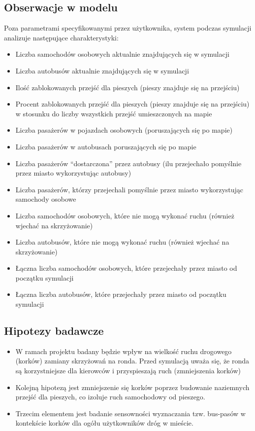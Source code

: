 \documentclass{article}
\begin{document}
\subsection{Obserwacje w modelu}
\label{subsection:obserwacje}
Poza parametrami specyfikowanymi przez użytkownika, system podczas symulacji analizuje następujące charakterystyki:
\begin{itemize}
    \item Liczba samochodów osobowych aktualnie znajdujących się w symulacji
    \item Liczba autobusów aktualnie znajdujących się w symulacji
    \item Ilość zablokowanych przejść dla pieszych (pieszy znajduje się na przejściu)
    \item Procent zablokowanych przejść dla pieszych (pieszy znajduje się na przejściu) w stosunku do liczby wszystkich przejść umieszczonych na mapie
    \item Liczba pasażerów w pojazdach osobowych (poruszających się po mapie)
    \item Liczba pasażerów w autobusach poruszających się po mapie
    \item Liczba pasażerów ``dostarczona'' przez autobusy (ilu przejechało pomyślnie przez miasto wykorzystując autobusy)
    \item Liczba pasażerów, którzy przejechali pomyślnie przez miasto wykorzystując samochody osobowe
    \item Liczba samochodów osobowych, które nie mogą wykonać ruchu (również wjechać na skrzyżowanie)
    \item Liczba autobusów, które nie mogą wykonać ruchu (również wjechać na skrzyżowanie)
    \item Łączna liczba samochodów osobowych, które przejechały przez miasto od początku symulacji
    \item Łączna liczba autobusów, które przejechały przez miasto od początku symulacji
\end{itemize}

\subsection{Hipotezy badawcze}
\label{subsection:hipotezy}
\begin{itemize}
    \item W ramach projektu badany będzie wpływ na wielkość ruchu drogowego (korków) zamiany skrzyżowań na ronda. Przed symulacją uważa się, że ronda są korzystniejsze dla kierowców i przyspieszają ruch (zmniejszenia korków)

    \item Kolejną hipotezą jest zmniejszenie się korków poprzez budowanie naziemnych przejść dla pieszych, co izoluje ruch samochodowy od pieszego.

    \item Trzecim elementem jest badanie sensowności wyznaczania tzw. bus-pasów w kontekście korków dla ogółu użytkowników dróg w mieście.
\end{itemize}
\end{document}
